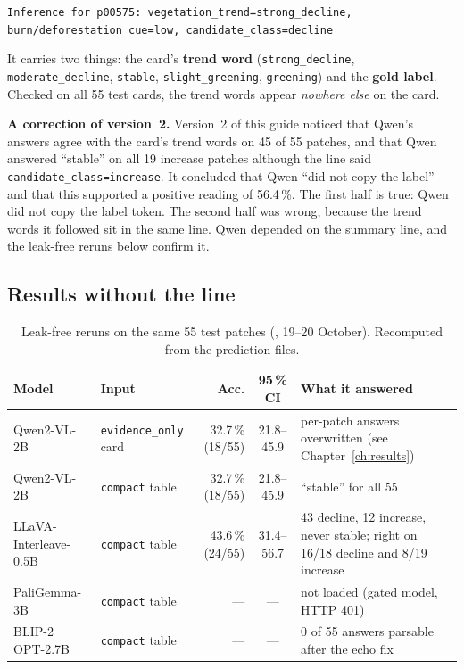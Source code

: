 \begin{center}
\small\texttt{Inference for p00575: vegetation\_trend=strong\_decline, burn/deforestation cue=low, candidate\_class=decline}
\end{center}

It carries two things: the card's \textbf{trend word} (\texttt{strong\_decline}, \texttt{moderate\_decline}, \texttt{stable}, \texttt{slight\_greening}, \texttt{greening}) and the \textbf{gold label}. Checked on all 55 test cards, the trend words appear \emph{nowhere else} on the card.

\begin{newinfo}
\textbf{A correction of version~2.} Version~2 of this guide noticed that Qwen's answers agree with the card's trend words on 45 of 55 patches, and that Qwen answered ``stable'' on all 19 increase patches although the line said \texttt{candidate\_class=increase}. It concluded that Qwen ``did not copy the label'' and that this supported a positive reading of 56.4\,\%. The first half is true: Qwen did not copy the label token. The second half was wrong, because the trend words it followed sit in the same line. Qwen depended on the summary line, and the leak-free reruns below confirm it.
\end{newinfo}

\subsection{Results without the line}

\begin{table}[H]
\centering
\caption{Leak-free reruns on the same 55 test patches (, 19--20 October). Recomputed from the prediction files.}
\label{tab:leakfree}
\small
\begin{tabularx}{\textwidth}{L{2.9cm}L{2.8cm}rcY}
\toprule
Model & Input & Acc. & 95\,\% CI & What it answered \\
\midrule
Qwen2-VL-2B & \texttt{evidence\_only} card & 32.7\,\% (18/55) & 21.8--45.9 & per-patch answers overwritten (see Chapter~\ref{ch:results}) \\
Qwen2-VL-2B & \texttt{compact} table & 32.7\,\% (18/55) & 21.8--45.9 & ``stable'' for all 55 \\
LLaVA-Interleave-0.5B & \texttt{compact} table & 43.6\,\% (24/55) & 31.4--56.7 & 43 decline, 12 increase, never stable; right on 16/18 decline and 8/19 increase \\
PaliGemma-3B & \texttt{compact} table & --- & --- & not loaded (gated model, HTTP 401) \\
BLIP-2 OPT-2.7B & \texttt{compact} table & --- & --- & 0 of 55 answers parsable after the echo fix \\
\bottomrule
\end{tabularx}
\end{table}

